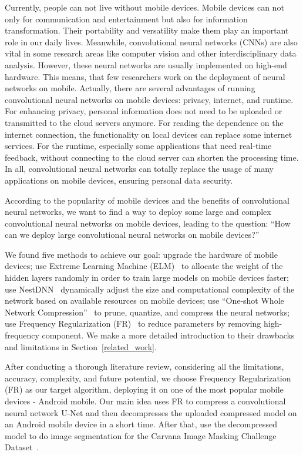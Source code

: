 \documentclass[runningheads]{llncs}
\begin{document}
Currently, people can not live without mobile devices. Mobile devices can not only for communication and entertainment but also for information transformation. Their portability and versatility make them play an important role in our daily lives. Meanwhile, convolutional neural networks (CNNs) are also vital in some research areas like computer vision and other interdisciplinary data analysis. However, these neural networks are usually implemented on high-end hardware. This means, that few researchers work on the deployment of neural networks on mobile. Actually, there are several advantages of running convolutional neural networks on mobile devices: privacy, internet, and runtime. For enhancing privacy, personal information does not need to be uploaded or transmitted to the cloud servers anymore. For reading the dependence on the internet connection, the functionality on local devices can replace some internet services. For the runtime, especially some applications that need real-time feedback, without connecting to the cloud server can shorten the processing time. In all, convolutional neural networks can totally replace the usage of many applications on mobile devices, ensuring personal data security. 

According to the popularity of mobile devices and the benefits of convolutional neural networks, we want to find a way to deploy some large and complex convolutional neural networks on mobile devices, leading to the question: “How can we deploy large convolutional neural networks on mobile devices?”

We found five methods to achieve our goal: upgrade the hardware of mobile devices; use Extreme Learning Machine (ELM)~\cite{anton2021elm} to allocate the weight of the hidden layers randomly in order to train large models on mobile devices faster; use NestDNN~\cite{fang2018nestdnn} dynamically adjust the size and computational complexity of the network based on available resources on mobile devices; use “One-shot Whole Network Compression”~\cite{kim2016oneshot} to prune, quantize, and compress the neural networks; use Frequency Regularization (FR)~\cite{zhao2023fr} to reduce parameters by removing high-frequency component. We make a more detailed introduction to their drawbacks and limitations in Section~\ref{related_work}.

After conducting a thorough literature review, considering all the limitations, accuracy, complexity, and future potential, we choose Frequency Regularization (FR) as our target algorithm, deploying it on one of the most popular mobile devices - Android mobile. Our main idea uses FR to compress a convolutional neural network U-Net and then decompresses the uploaded compressed model on an Android mobile device in a short time. After that, use the decompressed model to do image segmentation for the Carvana Image Masking Challenge Dataset~\cite{brian2017carvanadataset}. 
\end{document}
